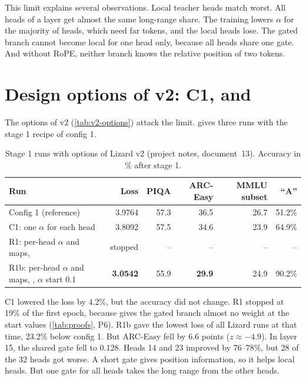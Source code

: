 This limit explains several observations. Local teacher heads match worst. All heads of a layer get almost the same long-range share. The training lowers $\alpha$ for the majority of heads, which need far tokens, and the local heads lose. The gated branch cannot become local for one head only, because all heads share one gate. And without RoPE, neither branch knows the relative position of two tokens.

\section{Design options of v2: C1,  and }
\label{sec:v2-runs}

The options of v2 (\cref{tab:v2-options}) attack the limit.  gives three runs with the stage 1 recipe of config 1.

\begin{table}[ht]
\centering
\small
\caption[Stage 1 runs with options of Lizard v2]{Stage 1 runs with options of Lizard v2 (project notes, document~13). Accuracy in \% after stage 1.}
\label{tab:v2-runs}
\begin{tabularx}{\linewidth}{@{}Lrrrrr@{}}
\toprule
Run & Loss & PIQA & ARC-Easy & MMLU subset & \enquote{A} \\
\midrule
Config 1 (reference) & 3.9764 & 57.3 & 36.5 & 26.7 & 51.2\% \\
C1: one $\alpha$ for each head & 3.8092 & 57.5 & 34.6 & 23.9 & 64.9\% \\
R1: per-head $\alpha$ and maps,  & stopped & -- & -- & -- & -- \\
R1b: per-head $\alpha$ and maps, , $\alpha$ start 0.1 & \textbf{3.0542} & 55.9 & \textbf{29.9} & 24.9 & 90.2\% \\
\bottomrule
\end{tabularx}
\end{table}

C1 lowered the loss by 4.2\%, but the accuracy did not change. R1 stopped at 19\% of the first epoch, because  gives the gated branch almost no weight at the start values (\cref{tab:proofs}, P6). R1b gave the lowest loss of all Lizard runs at that time, 23.2\% below config 1. But ARC-Easy fell by 6.6 points ($z \approx -4.9$). In layer 15, the shared gate fell to 0.128. Heads 14 and 23 improved by 76--78\%, but 28 of the 32 heads got worse. A short gate gives position information, so it helps local heads. But one gate for all heads takes the long range from the other heads.


